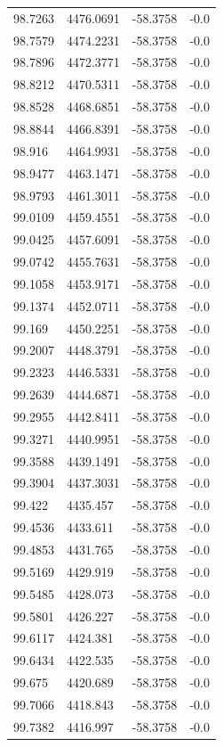 \begin{table}[H]
\begin{tabular}{llll}
98.7263 & 4476.0691 & -58.3758 & -0.0 \\
98.7579 & 4474.2231 & -58.3758 & -0.0 \\
98.7896 & 4472.3771 & -58.3758 & -0.0 \\
98.8212 & 4470.5311 & -58.3758 & -0.0 \\
98.8528 & 4468.6851 & -58.3758 & -0.0 \\
98.8844 & 4466.8391 & -58.3758 & -0.0 \\
98.916 & 4464.9931 & -58.3758 & -0.0 \\
98.9477 & 4463.1471 & -58.3758 & -0.0 \\
98.9793 & 4461.3011 & -58.3758 & -0.0 \\
99.0109 & 4459.4551 & -58.3758 & -0.0 \\
99.0425 & 4457.6091 & -58.3758 & -0.0 \\
99.0742 & 4455.7631 & -58.3758 & -0.0 \\
99.1058 & 4453.9171 & -58.3758 & -0.0 \\
99.1374 & 4452.0711 & -58.3758 & -0.0 \\
99.169 & 4450.2251 & -58.3758 & -0.0 \\
99.2007 & 4448.3791 & -58.3758 & -0.0 \\
99.2323 & 4446.5331 & -58.3758 & -0.0 \\
99.2639 & 4444.6871 & -58.3758 & -0.0 \\
99.2955 & 4442.8411 & -58.3758 & -0.0 \\
99.3271 & 4440.9951 & -58.3758 & -0.0 \\
99.3588 & 4439.1491 & -58.3758 & -0.0 \\
99.3904 & 4437.3031 & -58.3758 & -0.0 \\
99.422 & 4435.457 & -58.3758 & -0.0 \\
99.4536 & 4433.611 & -58.3758 & -0.0 \\
99.4853 & 4431.765 & -58.3758 & -0.0 \\
99.5169 & 4429.919 & -58.3758 & -0.0 \\
99.5485 & 4428.073 & -58.3758 & -0.0 \\
99.5801 & 4426.227 & -58.3758 & -0.0 \\
99.6117 & 4424.381 & -58.3758 & -0.0 \\
99.6434 & 4422.535 & -58.3758 & -0.0 \\
99.675 & 4420.689 & -58.3758 & -0.0 \\
99.7066 & 4418.843 & -58.3758 & -0.0 \\
99.7382 & 4416.997 & -58.3758 & -0.0 \\

\end{tabular}
\end{table}
